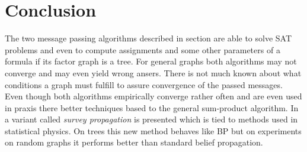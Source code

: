 \section{Conclusion}
The two message passing algorithms described in section are able to solve SAT problems and even to compute assignments and some other parameters of a formula if its factor graph is a tree. For general graphs both algorithms may not converge and may even yield wrong ansers. There is not much known about what conditions a graph must fulfill to assure convergence of the passed messages. \newline
Even though both algorithms empirically converge rather often and are even used in praxis there better techniques based to the general sum-product algorithm. In \cite{survprob} a variant called \emph{survey propagation} is presented which is tied to methods used in statistical physics. On trees this new method behaves like BP but on experiments on random graphs it performs better than standard belief propagation. 